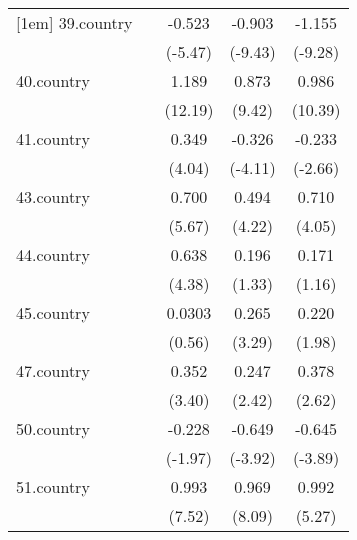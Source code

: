 {\begin{tabular}{l*{4}{c}}
[1em]
39.country  &                     &      -0.523\sym{***}&      -0.903\sym{***}&      -1.155\sym{***}\\
            &                     &     (-5.47)         &     (-9.43)         &     (-9.28)         \\
[1em]
40.country  &                     &       1.189\sym{***}&       0.873\sym{***}&       0.986\sym{***}\\
            &                     &     (12.19)         &      (9.42)         &     (10.39)         \\
[1em]
41.country  &                     &       0.349\sym{***}&      -0.326\sym{***}&      -0.233\sym{**} \\
            &                     &      (4.04)         &     (-4.11)         &     (-2.66)         \\
[1em]
43.country  &                     &       0.700\sym{***}&       0.494\sym{***}&       0.710\sym{***}\\
            &                     &      (5.67)         &      (4.22)         &      (4.05)         \\
[1em]
44.country  &                     &       0.638\sym{***}&       0.196         &       0.171         \\
            &                     &      (4.38)         &      (1.33)         &      (1.16)         \\
[1em]
45.country  &                     &      0.0303         &       0.265\sym{***}&       0.220\sym{*}  \\
            &                     &      (0.56)         &      (3.29)         &      (1.98)         \\
[1em]
47.country  &                     &       0.352\sym{***}&       0.247\sym{*}  &       0.378\sym{**} \\
            &                     &      (3.40)         &      (2.42)         &      (2.62)         \\
[1em]
50.country  &                     &      -0.228\sym{*}  &      -0.649\sym{***}&      -0.645\sym{***}\\
            &                     &     (-1.97)         &     (-3.92)         &     (-3.89)         \\
[1em]
51.country  &                     &       0.993\sym{***}&       0.969\sym{***}&       0.992\sym{***}\\
            &                     &      (7.52)         &      (8.09)         &      (5.27)         \\

\end{tabular}}
